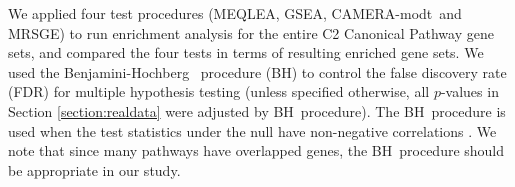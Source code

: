 \documentclass[a4,center,fleqn]{NAR}
\newcommand{\OurMethod}{MEQLEA}
\newcommand{\CMT}{CAMERA-modt}
\newcommand{\genr}{MRSGE}
\newcommand{\FDR}{Benjamini-Hochberg}
\newcommand{\FDRabb}{BH}
\begin{document}
	
	We applied four test procedures (\OurMethod, GSEA, \CMT~and \genr) to run enrichment analysis for
	the entire C2 Canonical Pathway gene sets, and compared the four tests in terms of resulting
	enriched gene sets. %
	We used the \FDR~\citep{benjamini1995controlling} procedure (\FDRabb) to control the false
	discovery rate (FDR) for multiple hypothesis testing (unless specified otherwise, all $p$-values in
	Section \ref{section:realdata} were adjusted by \FDRabb~procedure). The \FDRabb~procedure is used
	when the test statistics under the null have non-negative correlations \citep{benjamini2001control}.
	We note that since many pathways have overlapped genes, the \FDRabb~procedure should be appropriate
	in our study.
	
\end{document}
